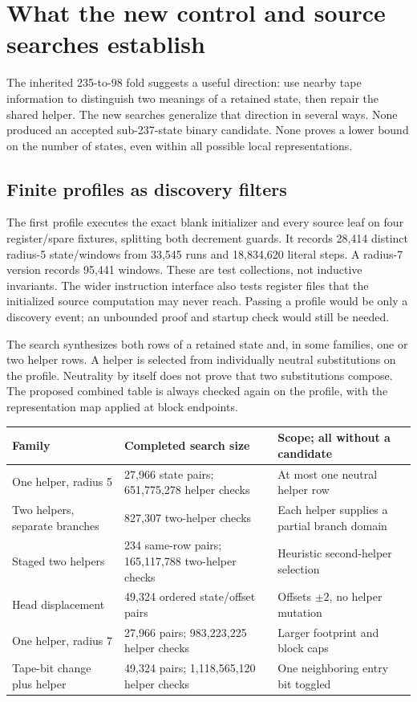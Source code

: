 \section{What the new control and source searches establish}
\label{sec:search}

The inherited 235-to-98 fold suggests a useful direction: use nearby tape
information to distinguish two meanings of a retained state, then repair the
shared helper. The new searches generalize that direction in several ways.
None produced an accepted sub-237-state binary candidate. None proves a lower
bound on the number of states, even within all possible local representations.

\subsection{Finite profiles as discovery filters}

The first profile executes the exact blank initializer and every source leaf
on four register/spare fixtures, splitting both decrement guards. It records
28,414 distinct radius-5 state/windows from 33,545 runs and 18,834,620 literal
steps. A radius-7 version records 95,441 windows. These are test collections,
not inductive invariants. The wider instruction interface also tests register
files that the initialized source computation may never reach. Passing a
profile would be only a discovery event; an unbounded proof and startup check
would still be needed.

The search synthesizes both rows of a retained state and, in some families,
one or two helper rows. A helper is selected from individually neutral
substitutions on the profile. Neutrality by itself does not prove that two
substitutions compose. The proposed combined table is always checked again
on the profile, with the representation map applied at block endpoints.

\begin{center}\small
\begin{tabularx}{\textwidth}{@{}p{}p{}X@{}}
\toprule
Family & Completed search size & Scope; all without a candidate\\
\midrule
One helper, radius 5 & 27,966 state pairs; 651,775,278 helper checks &
At most one neutral helper row\\
Two helpers, separate branches & 827,307 two-helper checks &
Each helper supplies a partial branch domain\\
Staged two helpers & 234 same-row pairs; 165,117,788 two-helper checks &
Heuristic second-helper selection\\
Head displacement & 49,324 ordered state/offset pairs &
Offsets $\pm2$, no helper mutation\\
One helper, radius 7 & 27,966 pairs; 983,223,225 helper checks &
Larger footprint and block caps\\
Tape-bit change plus helper & 49,324 pairs; 1,118,565,120 helper checks &
One neighboring entry bit toggled\\
\bottomrule
\end{tabularx}
\end{center}

